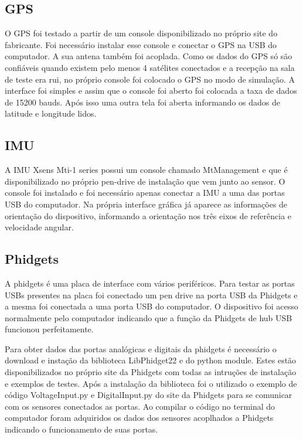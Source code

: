     \subsection{GPS}
    
    O GPS foi testado a partir de um console disponibilizado no próprio site do fabricante. Foi necessário instalar esse console e conectar o GPS na USB do computador. A sua antena também foi acoplada. Como os dados do GPS só são confiáveis quando existem pelo menos 4 satélites conectados e a recepção na sala de teste era rui, no próprio console foi colocado o GPS no modo de simulação. A interface foi simples e assim que o console foi aberto foi colocada a taxa de dados de 15200 bauds. Após isso uma outra tela foi aberta informando os dados de latitude e longitude lidos. 
    
    \subsection{IMU}
    
    A IMU Xsens Mti-1 series possui um console chamado MtManagement e que é disponibilizado no próprio pen-drive de instalação que vem junto ao sensor. O console foi instalado e foi necessário apenas conectar a IMU a uma das portas USB do computador. Na própria interface gráfica já aparece as informações de orientação do dispositivo, informando a orientação nos três eixos de referência e velocidade angular. 
    
    \subsection{Phidgets}
    
    A phidgets é uma placa de interface com vários periféricos. Para testar as portas USBs presentes na placa foi conectado um pen drive na porta USB da Phidgets e a mesma foi conectada a uma porta USB do computador. O dispositivo foi acesso normalmente pelo computador indicando que a função da Phidgets de hub USB funcionou perfeitamente.
    
    Para obter dados das portas analógicas e digitais da phidgets é necessário o download e instação da biblioteca LibPhidget22 e do python module. Estes estão disponibilizados no próprio site da Phidgets com todas as intruções de instalação e exemplos de testes. Após a instalação da biblioteca foi o utilizado o exemplo de código VoltageInput.py e DigitalInput.py do site da Phidgets para se comunicar com os sensores conectados as portas. Ao compilar o código no terminal do computador foram adquiridos os dados dos sensores acoplhados a Phidgets indicando o funcionamento de suas portas.
    
